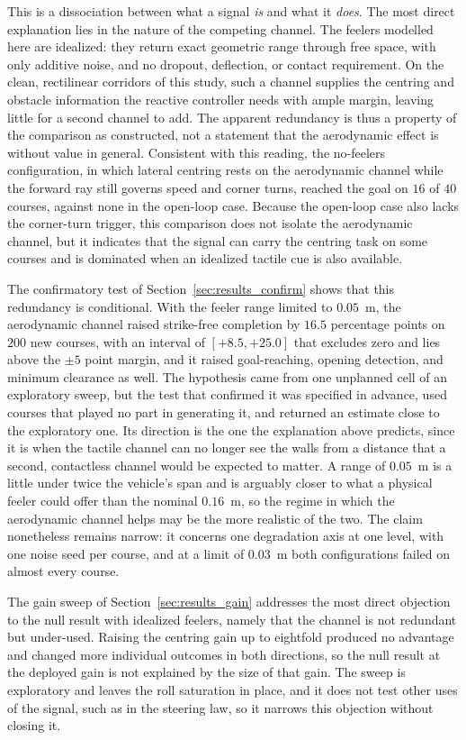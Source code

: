 \documentclass[final,5p,times]{elsarticle}
\begin{document}
This is a dissociation between what a signal \emph{is} and what it \emph{does}. The most direct explanation lies in the nature of the competing channel. The feelers modelled here are idealized: they return exact geometric range through free space, with only additive noise, and no dropout, deflection, or contact requirement. On the clean, rectilinear corridors of this study, such a channel supplies the centring and obstacle information the reactive controller needs with ample margin, leaving little for a second channel to add. The apparent redundancy is thus a property of the comparison as constructed, not a statement that the aerodynamic effect is without value in general. Consistent with this reading, the no-feelers configuration, in which lateral centring rests on the aerodynamic channel while the forward ray still governs speed and corner turns, reached the goal on $16$ of $40$ courses, against none in the open-loop case. Because the open-loop case also lacks the corner-turn trigger, this comparison does not isolate the aerodynamic channel, but it indicates that the signal can carry the centring task on some courses and is dominated when an idealized tactile cue is also available.

The confirmatory test of Section~\ref{sec:results_confirm} shows that this redundancy is conditional. With the feeler range limited to $0.05$~m, the aerodynamic channel raised strike-free completion by $16.5$ percentage points on $200$ new courses, with an interval of $[+8.5, +25.0]$ that excludes zero and lies above the $\pm 5$ point margin, and it raised goal-reaching, opening detection, and minimum clearance as well. The hypothesis came from one unplanned cell of an exploratory sweep, but the test that confirmed it was specified in advance, used courses that played no part in generating it, and returned an estimate close to the exploratory one. Its direction is the one the explanation above predicts, since it is when the tactile channel can no longer see the walls from a distance that a second, contactless channel would be expected to matter. A range of $0.05$~m is a little under twice the vehicle's span and is arguably closer to what a physical feeler could offer than the nominal $0.16$~m, so the regime in which the aerodynamic channel helps may be the more realistic of the two. The claim nonetheless remains narrow: it concerns one degradation axis at one level, with one noise seed per course, and at a limit of $0.03$~m both configurations failed on almost every course.

The gain sweep of Section~\ref{sec:results_gain} addresses the most direct objection to the null result with idealized feelers, namely that the channel is not redundant but under-used. Raising the centring gain up to eightfold produced no advantage and changed more individual outcomes in both directions, so the null result at the deployed gain is not explained by the size of that gain. The sweep is exploratory and leaves the roll saturation in place, and it does not test other uses of the signal, such as in the steering law, so it narrows this objection without closing it.
\end{document}
